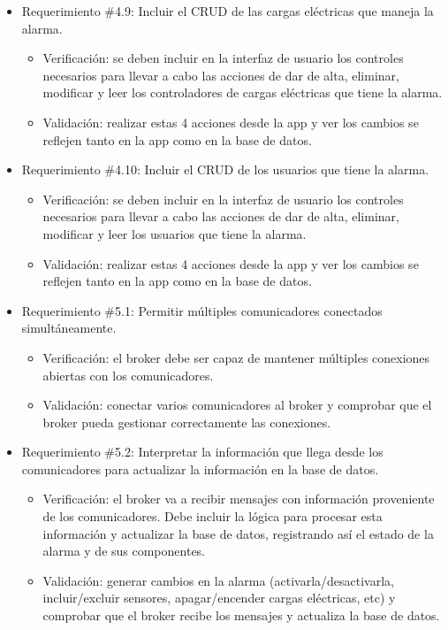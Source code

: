 \documentclass[
11pt, %
codirector, %
]{charter}
\begin{document}
\begin{itemize}
	\item Requerimiento \#4.9: Incluir el CRUD de las cargas eléctricas que maneja la alarma.
	\begin{itemize}
		\item Verificación: se deben incluir en la interfaz de usuario los controles necesarios  para llevar a cabo las acciones de dar de alta, eliminar, modificar y leer los controladores de cargas eléctricas que tiene la alarma.
		\item Validación: realizar estas 4 acciones desde la app y ver los cambios se reflejen tanto en la app como en la base de datos.
	\end{itemize}
			
	\item Requerimiento \#4.10: Incluir el CRUD de los usuarios que tiene la alarma.
	\begin{itemize}
		\item Verificación: se deben incluir en la interfaz de usuario los controles necesarios  para llevar a cabo las acciones de dar de alta, eliminar, modificar y leer los usuarios que tiene la alarma.
		\item Validación: realizar estas 4 acciones desde la app y ver los cambios se reflejen tanto en la app como en la base de datos.
	\end{itemize}
			
	\item Requerimiento \#5.1: Permitir múltiples comunicadores conectados simultáneamente.
	\begin{itemize}
		\item Verificación: el broker debe ser capaz de mantener múltiples conexiones abiertas con los comunicadores.
		\item Validación: conectar varios comunicadores al broker y comprobar que el broker pueda gestionar correctamente las conexiones.
	\end{itemize}
			
	\item Requerimiento \#5.2: Interpretar la información que llega desde los comunicadores para actualizar la información en la base de datos.
	\begin{itemize}
		\item Verificación: el broker va a recibir mensajes con información proveniente de los comunicadores. Debe incluir la lógica para procesar esta información y actualizar la base de datos, registrando así el estado de la alarma y de sus componentes.
		\item Validación: generar cambios en la alarma (activarla/desactivarla, incluir/excluir sensores, apagar/encender cargas eléctricas, etc) y comprobar que el broker recibe los mensajes y actualiza la base de datos.
	\end{itemize}
		

\end{itemize}
\end{document}
